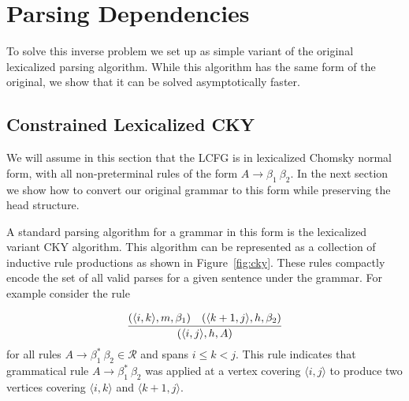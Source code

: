 \documentclass[11pt,letterpaper]{article}
\newcommand{\nonterms}{\mathcal{N}}
\newcommand{\rules}{\mathcal{R}}
\newcommand{\terms}{\mathcal{T}}
\newcommand{\Span}[1]{\langle #1 \rangle}
\newcommand{\Rule}[3]{#1 \rightarrow #2\ #3}
\newcommand{\RuleA}[3]{#1 \rightarrow #2^*\ #3}
\begin{document}



\section{Parsing Dependencies}

To solve this inverse problem we set up as simple variant of the
original lexicalized parsing algorithm. While this algorithm has the
same form of the original, we show that it can be solved
asymptotically faster.




\subsection{Constrained Lexicalized CKY}

We will assume in this section that the LCFG is in lexicalized Chomsky normal form, 
with all non-preterminal rules of the form $\Rule{A}{\beta_1}{\beta_2}$. 
In the next section we show how to convert our original grammar to this form while 
preserving the head structure. 

A standard parsing  algorithm for a grammar in this form is the lexicalized
variant CKY algorithm. This algorithm can be represented as a
collection of inductive rule productions as shown in
Figure~\ref{fig:cky}. These rules compactly encode the set of all 
valid parses for a given sentence under the grammar. For example consider the rule

\[ \infer{(\Span{i, j}, h, A)}{(\Span{i, k}, m, \beta_1) &  (\Span{k+1, j}, h, \beta_2)} \]
 for all rules $\RuleA{A}{\beta_1}{\beta_2}\in \rules$ and spans $i \leq k < j$. This rule indicates that grammatical rule $\RuleA{A}{\beta_1}{\beta_2}$  was applied at a vertex covering $\Span{i, j}$ to produce two vertices covering $\Span{i, k}$ and $\Span{k+1, j}$.








\end{document}
